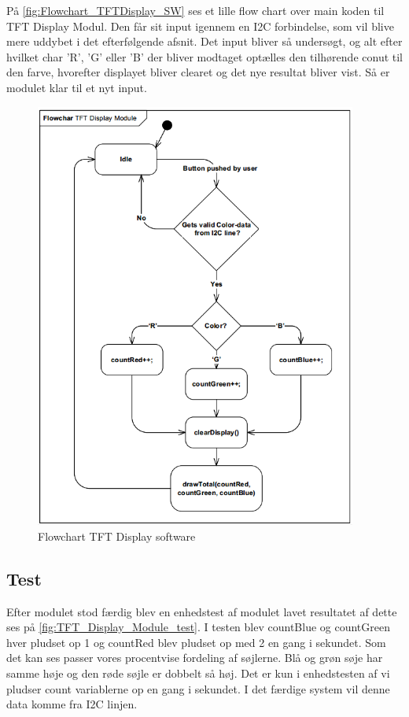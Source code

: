 På \autoref{fig:Flowchart_TFTDisplay_SW} ses et lille flow chart over main koden til TFT Display Modul. Den får sit input igennem en I2C forbindelse, som vil blive mere uddybet i det efterfølgende afsnit. Det input bliver så undersøgt, og alt efter hvilket char 'R', 'G' eller 'B' der bliver modtaget optælles den tilhørende conut til den farve, hvorefter displayet bliver clearet og det nye resultat bliver vist. Så er modulet klar til et nyt input.
\begin{figure}[H]
	\centering
	\includegraphics[width = 300pt]{Img/Flowchart_TFTDisplay_SW.png}
	\caption{Flowchart TFT Display software}
	\label{fig:Flowchart_TFTDisplay_SW}
\end{figure}


\subsection{Test}
Efter modulet stod færdig blev en enhedstest af modulet lavet resultatet af dette ses på \autoref{fig:TFT_Display_Module_test}. I testen blev countBlue og countGreen hver pludset op 1 og countRed blev pludset op med 2 en gang i sekundet. Som det kan ses passer vores procentvise fordeling af søjlerne. Blå og grøn søje har samme høje og den røde søjle er dobbelt så høj. Det er kun i enhedstesten af vi pludser count variablerne op en gang i sekundet. I det færdige system vil denne data komme fra I2C linjen. 


